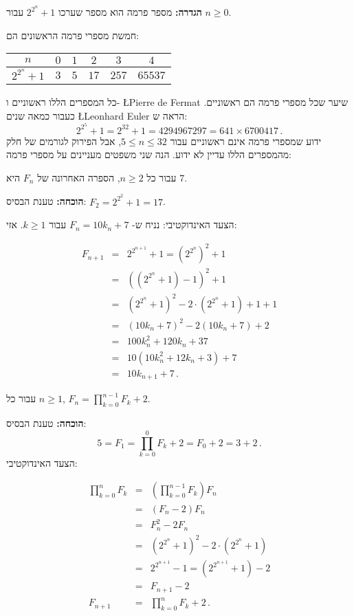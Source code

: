 \textbf{הגדרה:}
מספר פרמה הוא מספר שערכו
$2^{2^{n}}+1$
עבור 
$n\geq 0$.

חמשת מספרי  פרמה הראשונים הם:
\begin{center}


\begin{tabular}{|c|c|c|c|c|c|}
\hline
$n$ & $0$ & $1$ & $2$ & $3$ & $4$ \\\hline
$2^{2^{n}}+1$ & $3$ & $5$ & $17$ & $257$ & $65537$ \\\hline
\end{tabular}
\end{center}
כל המספרים הללו ראשוניים ו-%
\L{Pierre de Fermat}
שיער שכל מספרי פרמה הם ראשוניים. כעבור כמאה שנים
\L{Leonhard Euler}
הראה ש:
\[
2^{2^5}+1 = 2^{32}+1 = 4294967297 = 641 \times 6700417\,.
\]
ידוע שמספרי פרמה אינם ראשוניים עבור
$5\leq n \leq 32$,
אבל הפירוק לגורמים של חלק מהמספרים הללו עדיין לא ידוע. 
הנה שני משפטים מעניינים על מספרי פרמה:

\begin{theorem}
עבור כל
$n\geq 2$,
הספרה האחרונה של
$F_n$
היא
$7$.
\end{theorem}
\textbf{הוכחה:}
טענת הבסיס:
$F_2=2^{2^2}+1=17$.

הצעד האינדוקטיבי: נניח ש-%
$F_n=10k_n+7$
עבור
$k\geq 1$.
אזי:

\begin{eqnarray*}
F_{n+1}&=&2^{2^{n+1}}+1=\left(2^{2^{n}}\right)^2+1\\
&=&\left(\left(2^{2^{n}}+1\right)-1\right)^2+1\\
&=&\left(2^{2^{n}}+1\right)^2
-2\cdot\left(2^{2^{n}}+1\right)+1+1\\
&=&(10k_n+7)^2-2(10k_n+7)+2\\
&=&100k_n^2+120k_n+37\\
&=&10(10k_n^2+12k_n+3)+7\\
&=&10k_{n+1}+7\,.
\end{eqnarray*}



\begin{theorem}\label{thm.fermat}
עבור כל
$n\geq 1$, $\displaystyle F_n = \prod_{k=0}^{n-1} F_k + 2$.
\end{theorem}
\textbf{הוכחה:}
טענת הבסיס:
\[
5=F_1=\prod_{k=0}^{0} F_k + 2=F_0+2=3+2\,.
\]
הצעד האינדוקטיבי:

\begin{eqnarray*}
\displaystyle\prod_{k=0}^{n}F_k&=&\left(\displaystyle\prod_{k=0}^{n-1}F_k\right) F_n \\
&=& (F_n-2)F_n\\
&=& F_n^2-2F_n\\
&=& \left(2^{2^n}+1\right)^2-2\cdot \left(2^{2^n}+1\right)\\
&=& 2^{2^{n+1}}-1= (2^{2^{n+1}}+1)-2\\
&=&F_{n+1}-2\\
F_{n+1}&=&\displaystyle\prod_{k=0}^{n}F_k + 2\,.
\end{eqnarray*}

